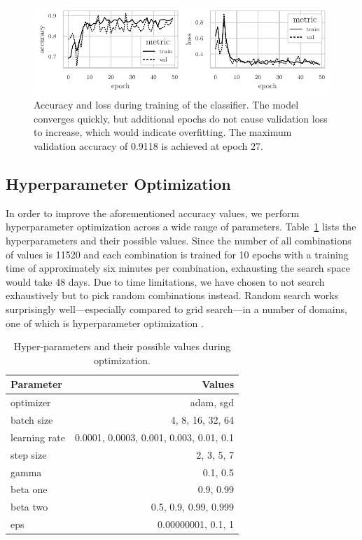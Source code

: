 \documentclass[draft,final]{vutinfth} %
\begin{document}
\begin{figure}
  \centering
  \includegraphics{graphics/classifier-metrics.pdf}
  \caption[Classifier accuracy and loss during training.]{Accuracy and
    loss during training of the classifier. The model converges
    quickly, but additional epochs do not cause validation loss to
    increase, which would indicate overfitting. The maximum validation
    accuracy of \num{0.9118} is achieved at epoch \num{27}.}
  \label{fig:classifier-training-metrics}
\end{figure}

\subsection{Hyperparameter Optimization}
\label{ssec:class-hypopt}

In order to improve the aforementioned accuracy values, we perform
hyperparameter optimization across a wide range of
parameters. Table~\ref{tab:classifier-hyps} lists the hyperparameters
and their possible values. Since the number of all combinations of
values is \num{11520} and each combination is trained for \num{10}
epochs with a training time of approximately six minutes per
combination, exhausting the search space would take \num{48} days. Due
to time limitations, we have chosen to not search exhaustively but to
pick random combinations instead. Random search works surprisingly
well---especially compared to grid search---in a number of domains, one of
which is hyperparameter optimization \cite{bergstra2012}.

\begin{table}[h]
  \centering
  \begin{tabular}{lr}
    \toprule
    Parameter &  Values \\
    \midrule
    optimizer &	adam, sgd \\
    batch size & 4, 8, 16, 32, 64 \\
    learning rate & 0.0001, 0.0003, 0.001, 0.003, 0.01, 0.1 \\
    step size & 2, 3, 5, 7 \\
    gamma & 0.1, 0.5 \\
    beta one & 0.9, 0.99 \\
    beta two & 0.5, 0.9, 0.99, 0.999 \\
    eps & 0.00000001, 0.1, 1 \\
    \bottomrule
  \end{tabular}
  \caption{Hyper-parameters and their possible values during
    optimization.}
  \label{tab:classifier-hyps}
\end{table}
\end{document}
